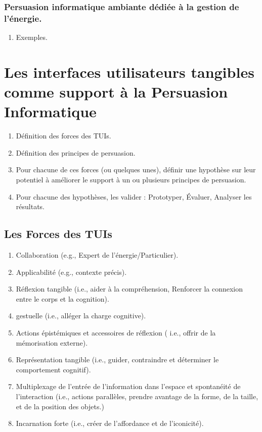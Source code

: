 \documentclass[10pt,a5paper,twoside]{article}
\begin{document}
\subsubsection{Persuasion informatique ambiante dédiée à la gestion de
l'énergie.}\label{persuasion-informatique-ambiante-duxe9diuxe9e-uxe0-la-gestion-de-luxe9nergie.}

\begin{enumerate}
\def\labelenumi{\arabic{enumi}.}
\itemsep1pt\parskip0pt
\item
  Exemples.
\end{enumerate}

\section{Les interfaces utilisateurs tangibles comme support à la
Persuasion
Informatique}\label{les-interfaces-utilisateurs-tangibles-comme-support-uxe0-la-persuasion-informatique}

\begin{enumerate}
\def\labelenumi{\arabic{enumi}.}
\itemsep1pt\parskip0pt
\item
  Définition des forces des TUIs.
\item
  Définition des principes de persuasion.
\item
  Pour chacune de ces forces (ou quelques unes), définir une hypothèse
  sur leur potentiel à améliorer le support à un ou plusieurs principes
  de persuasion.
\item
  Pour chacune des hypothèses, les valider : Prototyper, Évaluer,
  Analyser les résultats.
\end{enumerate}

\subsection{Les Forces des TUIs}\label{les-forces-des-tuis}

\begin{enumerate}
\def\labelenumi{\arabic{enumi}.}
\itemsep1pt\parskip0pt
\item
  Collaboration (e.g., Expert de l'énergie/Particulier).
\item
  Applicabilité (e.g., contexte précis).
\item
  Réflexion tangible (i.e., aider à la compréhension, Renforcer la
  connexion entre le corps et la cognition).
\item
  gestuelle (i.e., alléger la charge cognitive).
\item
  Actions épistémiques et accessoires de réflexion ( i.e., offrir de la
  mémorisation externe).
\item
  Représentation tangible (i.e., guider, contraindre et déterminer le
  comportement cognitif).
\item
  Multiplexage de l'entrée de l'information dans l'espace et spontanéité
  de l'interaction (i.e., actions parallèles, prendre avantage de la
  forme, de la taille, et de la position des objets.)
\item
  Incarnation forte (i.e., créer de l'affordance et de l'iconicité).
\end{enumerate}
\end{document}
